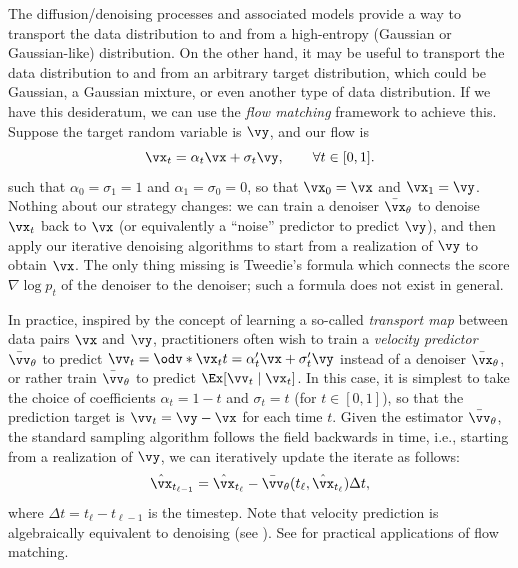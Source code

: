 \documentclass[../../book-main.tex]{subfiles}
\begin{document}
\begin{remark}\label{rem:flow_matching}
    The diffusion/denoising processes and associated models provide a
    way to transport the data distribution to and from a high-entropy
    (Gaussian or Gaussian-like) distribution. On the other hand, it
    may be useful to transport the data distribution to and from an
    arbitrary target distribution, which could be Gaussian, a
    Gaussian mixture, or even another type of data distribution. If
    we have this desideratum, we can use the \textit{flow matching}
    framework to achieve this. Suppose the target random variable is
    \(\vy\), and our flow is
    \begin{equation}
        \vx_{t} = \alpha_{t}\vx + \sigma_{t}\vy, \qquad \forall t \in [0, 1].
    \end{equation}
    such that \(\alpha_{0} = \sigma_{1} = 1\) and \(\alpha_{1} =
    \sigma_{0} = 0\), so that \(\vx_{0} = \vx\) and \(\vx_{1} =
    \vy\). Nothing about our strategy changes: we
    can train a denoiser \(\bar{\vx}_{\theta}\) to denoise
    \(\vx_{t}\) back to \(\vx\) (or equivalently a ``noise''
    predictor to predict \(\vy\)), and then apply our iterative
    denoising algorithms to start from a realization of \(\vy\) to
    obtain \(\vx\). The only thing missing is Tweedie's formula which
    connects the score \(\nabla \log p_{t}\) of the denoiser to the
    denoiser; such a formula does not exist in general.

    In practice, inspired by the concept of learning a so-called
    \textit{transport map} between data pairs \(\vx\) and \(\vy\),
    practitioners often wish to train a \textit{velocity predictor}
    \(\bar{\vv}_{\theta}\) to predict \(\vv_{t} = \odv*{\vx_{t}}{t} =
    \alpha_{t}^{\prime}\vx + \sigma_{t}^{\prime}\vy\) instead of a
    denoiser \(\bar{\vx}_{\theta}\), or rather train
    \(\bar{\vv}_{\theta}\) to predict \(\Ex[\vv_{t} \mid \vx_{t}]\).
    In this case, it is simplest to take the choice of coefficients
    \(\alpha_{t} = 1 - t\) and
    \(\sigma_{t} = t\) (for \(t \in [0, 1]\)), so that the prediction
    target is \(\vv_{t} = \vy - \vx\) for each time \(t\). Given the
    estimator \(\bar{\vv}_{\theta}\), the standard sampling algorithm
    follows the field backwards in time, i.e., starting from a
    realization of \(\vy\), we can iteratively update the iterate as follows:
    \begin{equation}
        \hat{\vx}_{t_{\ell - 1}} = \hat{\vx}_{t_{\ell}} -
        \bar{\vv}_{\theta}(t_{\ell}, \hat{\vx}_{t_{\ell}}) \Delta t,
    \end{equation}
    where \(\Delta t = t_{\ell} - t_{\ell - 1}\) is the timestep.
    Note that velocity prediction is algebraically equivalent to
    denoising (see ). See
     for practical
    applications of flow matching.
\end{remark}
\end{document}
